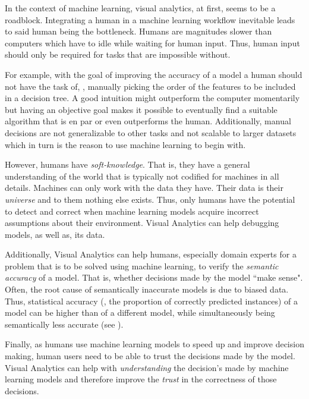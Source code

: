 In the context of machine learning, visual analytics, at first, seems to be a roadblock.
Integrating a human in a machine learning workflow inevitable leads to said human being the bottleneck.
Humans are magnitudes slower than computers which have to idle while waiting for human input.
Thus, human input should only be required for tasks that are impossible without.

For example, with the goal of improving the accuracy of a model a human should not have the task of, \eg, manually picking the order of the features to be included in a decision tree.
A good intuition might outperform the computer momentarily but having an objective goal makes it possible to eventually find a suitable algorithm that is en par or even outperforms the human.
Additionally, manual decisions are not generalizable to other tasks and not scalable to larger datasets which in turn is the reason to use machine learning to begin with.

However, humans have \emph{soft-knowledge}.
That is, they have a general understanding of the world that is typically not codified for machines in all details.
Machines can only work with the data they have.
Their data is their \emph{universe} and to them nothing else exists.
Thus, only humans have the potential to detect and correct when machine learning models acquire incorrect assumptions about their environment.
Visual Analytics can help debugging models, as well as, its data.

Additionally, Visual Analytics can help humans, especially domain experts for a problem that is to be solved using machine learning, to verify the \emph{semantic accuracy} of a model.
That is, whether decisions made by the model ``make sense".
Often, the root cause of semantically inaccurate models is due to biased data.
Thus, statistical accuracy (\ie, the proportion of correctly predicted instances) of a model can be higher than of a different model, while simultaneously being semantically less accurate (see \cite{Caruana:2015:IMH:2783258.2788613,explainer}).

Finally, as humans use machine learning models to speed up and improve decision making, human users need to be able to trust the decisions made by the model.
Visual Analytics can help with \emph{understanding} the decision's made by machine learning models and therefore improve the \emph{trust} in the correctness of those decisions.
